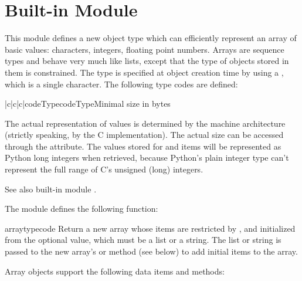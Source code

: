 \section{Built-in Module }

This module defines a new object type which can efficiently represent
an array of basic values: characters, integers, floating point
numbers.  Arrays are sequence types and behave very much like lists,
except that the type of objects stored in them is constrained.  The
type is specified at object creation time by using a ,
which is a single character.  The following type codes are defined:

\begin{tableiii}{|c|c|c|}{code}{Typecode}{Type}{Minimal size in bytes}
\end{tableiii}

The actual representation of values is determined by the machine
architecture (strictly speaking, by the C implementation).  The actual
size can be accessed through the  attribute.  The values
stored  for  and  items will be represented as
Python long integers when retrieved, because Python's plain integer
type can't represent the full range of C's unsigned (long) integers.

See also built-in module .

The module defines the following function:

\renewcommand{\indexsubitem}{(in module array)}

\begin{funcdesc}{array}{typecode}
Return a new array whose items are restricted by , and
initialized from the optional  value, which must be a
list or a string.  The list or string is passed to the new array's
 or  method (see below) to add
initial items to the array.
\end{funcdesc}

Array objects support the following data items and methods:

